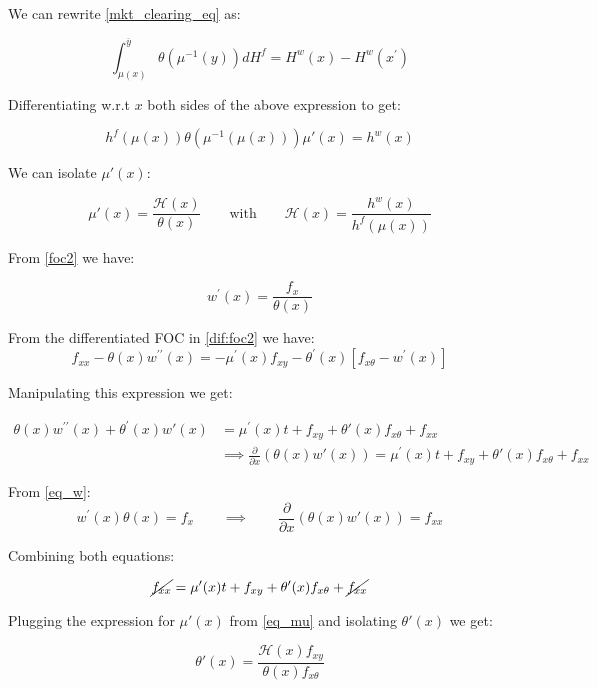 \documentclass[12pt]{article}
\theoremstyle{definition}
\newcommand{\qiq}{\qquad \implies \qquad}
\begin{document}
We can rewrite \eqref{mkt_clearing_eq} as:

\begin{equation}\label{mkt_clearing_eq_2}
    \int_{\mu(x)}^{\overline{y}}{ \theta(\mu^{-1}(y)) dH^f }  =  H^{w}(x)-H^{w}\left(x^{\prime}\right)
\end{equation}

Differentiating w.r.t $x$ both sides of the above expression to get:

$$h^f(\mu(x))\theta(\mu^{-1}(\mu(x)))\mu'(x) = h^w(x)$$

We can isolate $\mu'(x)$:

\begin{equation}\label{eq_mu}
\mu'(x) = \frac{\mathcal{H}(x)}{\theta(x)}\qquad \text{with} \qquad \mathcal{H}(x)= \frac{h^{w}(x)}{h^{f}(\mu(x))}    
\end{equation}


From \eqref{foc2} we have:

\begin{equation}\label{eq_w}
    w^{\prime}(x) =\frac{f_{x}}{\theta(x) }    
\end{equation}
 
From the differentiated FOC in \eqref{dif:foc2} we have:
$$f_{x x}-\theta(x) w^{\prime \prime}(x) =-\mu^{\prime}(x) f_{x y}-\theta^{\prime}(x)\left[f_{x \theta}-w^{\prime}(x)\right]$$
 
 Manipulating this expression we get:
 
 \begin{align*}
\theta(x) w^{\prime \prime}(x)+\theta^{\prime}(x) w'(x)&=\mu^{\prime}(x) t+f_{x y}+\theta'(x) f_{x \theta}+f_{x x}\\ &\implies \frac{\partial}{\partial x}\left(\theta(x)w'(x) \right)
=\mu^{\prime}(x) t+f_{x y}+\theta'(x) f_{x \theta}+f_{x x}
\end{align*}

From \eqref{eq_w}:
$$w^{\prime}(x)\theta(x) = f_{x}\qiq   \frac{\partial}{\partial x}\left(\theta(x)w'(x) \right)
= f_{xx}  $$

Combining both equations:

$$\cancel{f_{xx}} = \mu^{\prime}(x) t+f_{x y}+\theta'(x) f_{x \theta}+\cancel{f_{x x}}$$

Plugging the expression for $\mu'(x)$ from \eqref{eq_mu} and isolating $\theta'(x)$ we get:

\begin{equation}\label{eq_th}
    \theta'(x) = \frac{\mathcal{H}(x)f_{x y}}{\theta(x) f_{x \theta}}
\end{equation}
\end{document}
